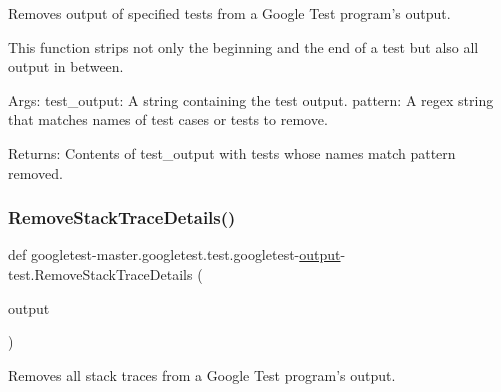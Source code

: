 \begin{DoxyVerb}Removes output of specified tests from a Google Test program's output.

This function strips not only the beginning and the end of a test but also
all output in between.

Args:
  test_output:       A string containing the test output.
  pattern:           A regex string that matches names of test cases or
                     tests to remove.

Returns:
  Contents of test_output with tests whose names match pattern removed.
\end{DoxyVerb}
 \mbox{\label{namespacegoogletest-master_1_1googletest_1_1test_1_1googletest-output-test_aee873d176cddc7bb2559b50887419433}} 
\subsubsection{\texorpdfstring{RemoveStackTraceDetails()}{RemoveStackTraceDetails()}}
{\footnotesize\ttfamily def googletest-\/master.\+googletest.\+test.\+googletest-\/\mbox{\hyperlink{namespacegoogletest-master_1_1googletest_1_1test_1_1googletest-output-test_a734f0a5bd94ba038f4350763c6977129}{output}}-\/test.\+Remove\+Stack\+Trace\+Details (\begin{DoxyParamCaption}\item[{}]{output }\end{DoxyParamCaption})}

\begin{DoxyVerb}Removes all stack traces from a Google Test program's output.\end{DoxyVerb}
 \mbox{\label{namespacegoogletest-master_1_1googletest_1_1test_1_1googletest-output-test_ae1a87e3ccd04cfdf3363c25222f8bc3f}} 
